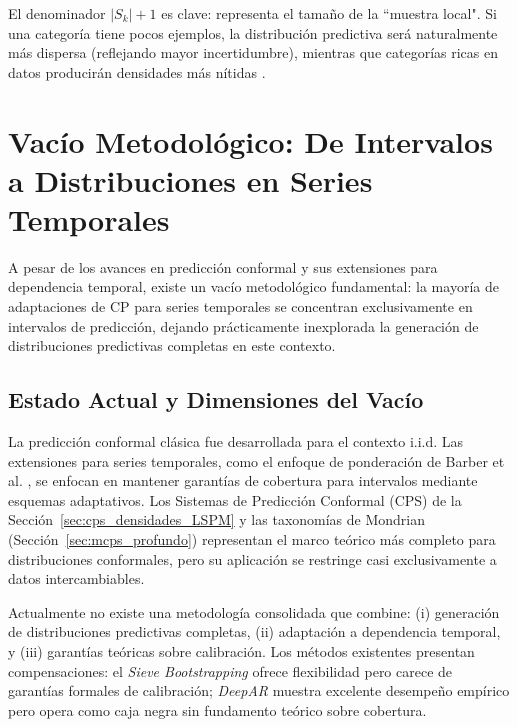 El denominador $|S_k| + 1$ es clave: representa el tamaño de la ``muestra local". Si una categoría tiene pocos ejemplos, la distribución predictiva será naturalmente más dispersa (reflejando mayor incertidumbre), mientras que categorías ricas en datos producirán densidades más nítidas \cite{Vovk2022}.

\section{Vacío Metodológico: De Intervalos a Distribuciones en Series Temporales}
\label{sec:vacio_metodologico}

A pesar de los avances en predicción conformal y sus extensiones para dependencia temporal, existe un vacío metodológico fundamental: la mayoría de adaptaciones de CP para series temporales se concentran exclusivamente en intervalos de predicción, dejando prácticamente inexplorada la generación de distribuciones predictivas completas en este contexto.

\subsection{Estado Actual y Dimensiones del Vacío}

La predicción conformal clásica \parencite{Vovk2005} fue desarrollada para el contexto i.i.d. Las extensiones para series temporales, como el enfoque de ponderación de Barber et al. \parencite{Barber2023}, se enfocan en mantener garantías de cobertura para intervalos mediante esquemas adaptativos. Los Sistemas de Predicción Conformal (CPS) de la Sección~\ref{sec:cps_densidades_LSPM} y las taxonomías de Mondrian (Sección~\ref{sec:mcps_profundo}) representan el marco teórico más completo para distribuciones conformales, pero su aplicación se restringe casi exclusivamente a datos intercambiables.

Actualmente no existe una metodología consolidada que combine: (i) generación de distribuciones predictivas completas, (ii) adaptación a dependencia temporal, y (iii) garantías teóricas sobre calibración. Los métodos existentes presentan compensaciones: el \textit{Sieve Bootstrapping} \parencite{Lahiri2003} ofrece flexibilidad pero carece de garantías formales de calibración; \textit{DeepAR} \parencite{Salinas2020} muestra excelente desempeño empírico pero opera como caja negra sin fundamento teórico sobre cobertura.

